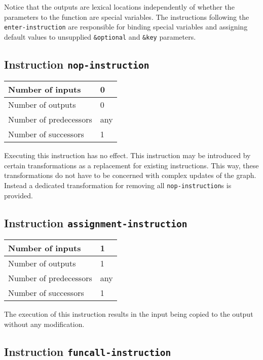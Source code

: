 Notice that the outputs are lexical locations independently of whether
the parameters to the function are special variables.  The
instructions following the \texttt{enter-instruction} are responsible
for binding special variables and assigning default values to
unsupplied \texttt{\&optional} and \texttt{\&key} parameters.

\subsection{Instruction \texttt{nop-instruction}}
\label{hir-instruction-nop}

\begin{tabular}{|l|l|}
\hline
Number of inputs & 0\\
\hline
Number of outputs & 0\\
\hline
Number of predecessors & any\\
\hline
Number of successors & 1\\
\hline
\end{tabular}

Executing this instruction has no effect.  This instruction may be
introduced by certain transformations as a replacement for existing
instructions.  This way, these transformations do not have to be
concerned with complex updates of the graph.  Instead a dedicated
transformation for removing all \texttt{nop-instruction}s is provided.

\subsection{Instruction \texttt{assignment-instruction}}
\label{hir-instruction-assignment}

\begin{tabular}{|l|l|}
\hline
Number of inputs & 1\\
\hline
Number of outputs & 1\\
\hline
Number of predecessors & any\\
\hline
Number of successors & 1\\
\hline
\end{tabular}

The execution of this instruction results in the input being copied to
the output without any modification. 

\subsection{Instruction \texttt{funcall-instruction}}
\label{hir-instruction-funcall}

